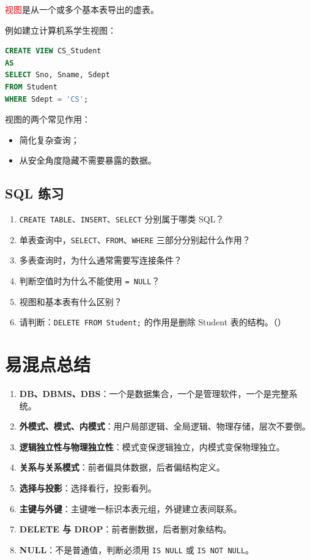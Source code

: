 \documentclass{../../note}
\begin{document}
\textcolor{red}{视图}是从一个或多个基本表导出的虚表。

例如建立计算机系学生视图：

\begin{lstlisting}[language=SQL]
CREATE VIEW CS_Student
AS
SELECT Sno, Sname, Sdept
FROM Student
WHERE Sdept = 'CS';
\end{lstlisting}

视图的两个常见作用：

\begin{itemize}
  \item 简化复杂查询；
  \item 从安全角度隐藏不需要暴露的数据。
\end{itemize}

\subsection{SQL 练习}

\begin{enumerate}
  \item \texttt{CREATE TABLE}、\texttt{INSERT}、\texttt{SELECT} 分别属于哪类 SQL？
  \item 单表查询中，\texttt{SELECT}、\texttt{FROM}、\texttt{WHERE} 三部分分别起什么作用？
  \item 多表查询时，为什么通常需要写连接条件？
  \item 判断空值时为什么不能使用 \texttt{= NULL}？
  \item 视图和基本表有什么区别？
  \item 请判断：\texttt{DELETE FROM Student;} 的作用是删除 Student 表的结构。（\hspace{1cm}）
\end{enumerate}

\section{易混点总结}

\begin{enumerate}
  \item \textbf{DB、DBMS、DBS}：一个是数据集合，一个是管理软件，一个是完整系统。
  \item \textbf{外模式、模式、内模式}：用户局部逻辑、全局逻辑、物理存储，层次不要倒。
  \item \textbf{逻辑独立性与物理独立性}：模式变保逻辑独立，内模式变保物理独立。
  \item \textbf{关系与关系模式}：前者偏具体数据，后者偏结构定义。
  \item \textbf{选择与投影}：选择看行，投影看列。
  \item \textbf{主键与外键}：主键唯一标识本表元组，外键建立表间联系。
  \item \textbf{DELETE 与 DROP}：前者删数据，后者删对象结构。
  \item \textbf{NULL}：不是普通值，判断必须用 \texttt{IS NULL} 或 \texttt{IS NOT NULL}。
\end{enumerate}
\end{document}
